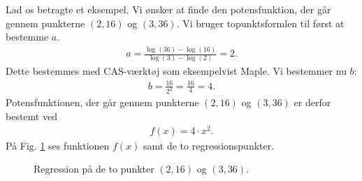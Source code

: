 \documentclass[12pt]{article}
\begin{document}
\begin{exa}
Lad os betragte et eksempel. Vi ønsker at finde den potensfunktion, der går gennem punkterne $(2,16)$ og  $(3,36)$. 
Vi bruger topunktsformlen til først at bestemme $a$.
\begin{align*}
a = \frac{\log(36)-\log(16)}{\log(3)-\log(2)} = 2.
\end{align*}
Dette bestemmes med CAS-værktøj som eksempelvist Maple. 
Vi bestemmer nu $b$:
\begin{align*}
b = \frac{16}{2^2} = \frac{16}{4} = 4.
\end{align*}
Potensfunktionen, der går gennem punkterne  $(2,16)$ og  $(3,36)$ er derfor bestemt ved
\begin{align*}
f(x) = 4\cdot x^2.
\end{align*}
På Fig. \ref{fig:topunktpotens} ses funktionen $f(x)$ samt de to regressionspunkter. 
\begin{figure}[H]
\centering
{}
\caption{Regression på de to punkter $(2,16)$ og $(3,36)$.}
\label{fig:topunktpotens}
\end{figure}
\end{exa}
\end{document}
